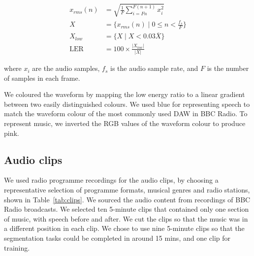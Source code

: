 \begin{align}
  x_{rms}(n) &= \sqrt{\frac{1}{F} \displaystyle\sum\limits_{i=Fn}^{F(n+1)} x_i^2}\\
  X &= \{x_{rms}(n) \mid 0 \leq n < \frac{f_s}{F}\}\\
  X_{low} &= \{X \mid X < 0.03\overline{X}\}\\
  \text{LER} &= 100 \times \frac{|X_{low}|}{|X|}\label{eq:ler}
\end{align}

where $x_i$ are the audio samples, $f_s$ is the audio sample rate, and $F$ is the number of samples in each frame.



We coloured the waveform by mapping the low energy ratio to a linear gradient between two easily distinguished colours.
We used blue for representing speech to match the waveform colour of the most commonly used DAW in BBC Radio. To
represent music, we inverted the RGB values of the waveform colour to produce pink.

\subsection{Audio clips}
We used radio programme recordings for the audio clips, by choosing a representative selection of programme formats,
musical genres and radio stations, shown in Table~\ref{tab:clips}.  We sourced the audio content from recordings of BBC
Radio broadcasts. We selected ten 5-minute clips that contained only one section of music, with speech before and
after. We cut the clips so that the music was in a different position in each clip.  We chose to use nine 5-minute
clips so that the segmentation tasks could be completed in around 15 mins, and one clip for training.

